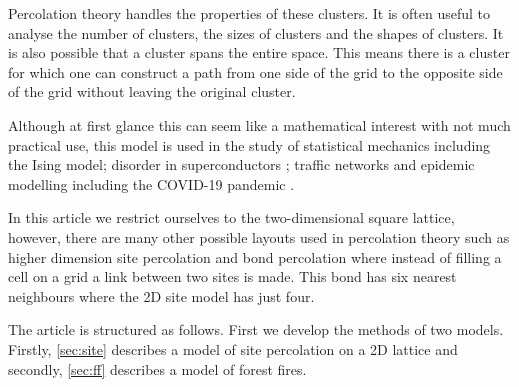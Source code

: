 \documentclass[%
 reprint,
 amsmath,amssymb,
 aps,
]{revtex4-2}
\begin{document}
Percolation theory handles the properties of these clusters. It is often useful to analyse the number of clusters, the sizes of clusters and the shapes of clusters. It is also possible that a cluster spans the entire space. This means there is a cluster for which one can construct a path from one side of the grid to the opposite side of the grid without leaving the original cluster. 

Although at first glance this can seem like a mathematical interest with not much practical use, this model is used in the study of statistical mechanics including the Ising model; disorder in superconductors \cite{alexander_superconductivity_1983}; traffic networks \cite{li_percolation_2015} and epidemic modelling including the COVID-19 pandemic \cite{mello_epidemics_2020}.

In this article we restrict ourselves to the two-dimensional square lattice, however, there are many other possible layouts used in percolation theory such as higher dimension site percolation and bond percolation where instead of filling a cell on a grid a link between two sites is made. This bond has six nearest neighbours where the 2D site model has just four. 

The article is structured as follows. First we develop the methods of two models. Firstly, \cref{sec:site} describes a model of site percolation on a 2D lattice and secondly, \cref{sec:ff} describes a model of forest fires. 


\end{document}
